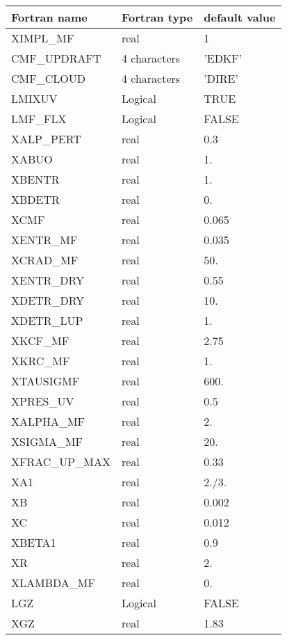 \begin{center}
\begin{tabular} {|l|l|l|}
\hline
Fortran name & Fortran type & default value \\
\hline
XIMPL\_MF      &  real         &   1        \\
CMF\_UPDRAFT   &  4 characters &   'EDKF'   \\
CMF\_CLOUD     &  4 characters &   'DIRE'   \\
LMIXUV         &  Logical      &    TRUE    \\ 
LMF\_FLX       &  Logical      &    FALSE   \\
XALP\_PERT     &  real         &    0.3     \\
XABUO          &  real         &    1.      \\
XBENTR         &  real         &    1.      \\
XBDETR         &  real         &    0.      \\
XCMF           &  real         &    0.065   \\
XENTR\_MF      &  real         &    0.035   \\
XCRAD\_MF      &  real         &    50.     \\
XENTR\_DRY     &  real         &    0.55    \\
XDETR\_DRY     &  real         &    10.     \\
XDETR\_LUP     &  real         &    1.      \\
XKCF\_MF       &  real         &    2.75    \\
XKRC\_MF       &  real         &    1.      \\
XTAUSIGMF      &  real         &    600.    \\
XPRES\_UV      &  real         &    0.5     \\
XALPHA\_MF     &  real         &    2.      \\
XSIGMA\_MF     &  real         &    20.     \\
XFRAC\_UP\_MAX &  real         &    0.33    \\
XA1            &  real         &    2./3.   \\
XB             &  real         &    0.002   \\
XC             &  real         &    0.012   \\
XBETA1         &  real         &    0.9     \\
XR             &  real         &    2.      \\
XLAMBDA\_MF    &  real         &    0.      \\
LGZ            &  Logical      &    FALSE   \\
XGZ            &  real         &    1.83    \\

\hline

\end{tabular}
\end{center}

